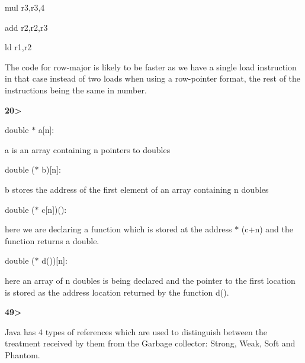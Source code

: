 \documentclass[12pt]{article}
\renewcommand{\_}{\kern-1.5pt\textunderscore\kern-1.5pt}
\begin{document}
mul r3,r3,4\par

add r2,r2,r3\par

ld r1,r2\par


\vspace{\baselineskip}
The code for row-major is likely to be faster as we have a single load instruction in that case instead of two loads when using a row-pointer format, the rest of the instructions being the same in number.\par


\vspace{\baselineskip}

\vspace{\baselineskip}
\textbf{20>}\par


\vspace{\baselineskip}
double $\ast$ a[n]:\par

\tab a is an array containing n pointers to doubles\par


\vspace{\baselineskip}
double ($\ast$ b)[n]:\par

\tab b stores the address of the first element of an array containing n doubles\par


\vspace{\baselineskip}
double ($\ast$ c[n])():\par

\tab here we are declaring a function which is stored at the address $\ast$ (c+n) and the function returns a double.\par


\vspace{\baselineskip}
double ($\ast$ d())[n]:\par

\tab here an array of n doubles is being declared and the pointer to the first location is stored as the address location returned by the function d().\par


\vspace{\baselineskip}
\textbf{49> }\par


\vspace{\baselineskip}
Java has 4 types of references which are used to distinguish between the treatment received by them from the Garbage collector: Strong, Weak, Soft and Phantom.\par
\end{document}
